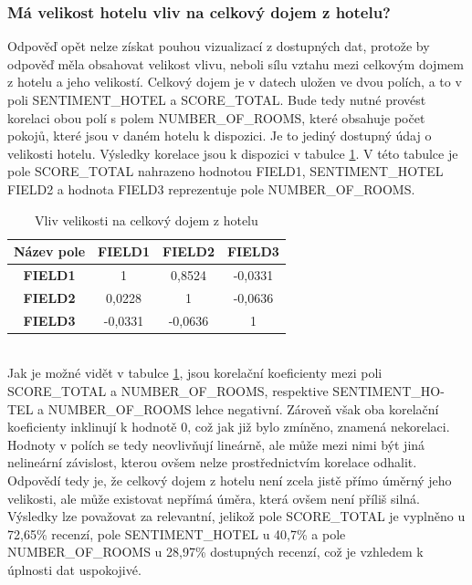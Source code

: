 \documentclass[czech,BP]{thesiskiv}
\begin{document}
\subsubsection{Má velikost hotelu vliv na celkový dojem z hotelu?}
\label{subsub:velikost hotelu}
Odpověď opět nelze získat pouhou vizualizací z dostupných dat, protože by odpověď měla obsahovat velikost vlivu, neboli sílu vztahu mezi celkovým dojmem z hotelu a jeho velikostí. Celkový dojem je v datech uložen ve dvou polích, a to v poli SENTIMENT\_HOTEL a SCORE\_TOTAL. Bude tedy nutné provést korelaci obou polí s polem NUMBER\_OF\_ROOMS, které obsahuje počet pokojů, které jsou v daném hotelu k dispozici. Je to jediný dostupný údaj o velikosti hotelu.  Výsledky korelace jsou k dispozici v tabulce \ref{hotel_korelace}. V této tabulce je pole SCORE\_TOTAL nahrazeno hodnotou FIELD1, SENTIMENT\_HOTEL FIELD2 a hodnota FIELD3 reprezentuje pole NUMBER\_OF\_ROOMS.
\begin{table}[h]
	\centering

	\begin{tabular}{|c|c|c|c|}
		\hline
		\textbf{Název pole} & \textbf{FIELD1} & \textbf{FIELD2} & \textbf{FIELD3} \\ \hline
		\textbf{FIELD1}     & 1               & 0,8524          & -0,0331         \\ \hline
		\textbf{FIELD2}     & 0,0228          & 1               & -0,0636         \\ \hline
		\textbf{FIELD3}     & -0,0331         & -0,0636         & 1               \\ \hline
	\end{tabular}
	\caption{Vliv velikosti na celkový dojem z hotelu}
\label{hotel_korelace}
\end{table}


\mbox{}\\
Jak je možné vidět v tabulce \ref{hotel_korelace}, jsou korelační koeficienty mezi poli SCO\-RE\_TOTAL a NUMBER\_OF\_ROOMS, respektive SENTIMENT\_HO- TEL a NUMBER\_OF\_ROOMS lehce negativní. Zároveň však oba korelační koeficienty inklinují k hodnotě 0, což jak již bylo zmíněno, znamená nekorelaci. Hodnoty v polích se tedy neovlivňují lineárně, ale může mezi nimi být jiná nelineární závislost, kterou ovšem nelze prostřednictvím korelace odhalit. Odpovědí tedy je, že  celkový dojem z hotelu není zcela jistě přímo úměrný jeho velikosti, ale může existovat nepřímá úměra, která ovšem není příliš silná. Výsledky lze považovat za relevantní, jelikož pole SCORE\_TOTAL je vyplněno u 72,65\% recenzí, pole SENTIMENT\_HOTEL u 40,7\% a pole NUMBER\_OF\_ROOMS u 28,97\% dostupných recenzí, což je vzhledem k úplnosti dat uspokojivé.
\end{document}
